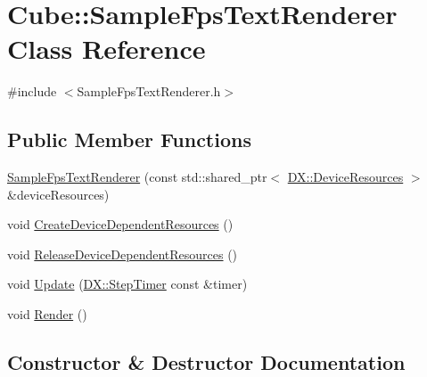 \hypertarget{class_cube_1_1_sample_fps_text_renderer}{}\section{Cube\+:\+:Sample\+Fps\+Text\+Renderer Class Reference}
\label{class_cube_1_1_sample_fps_text_renderer}


{\ttfamily \#include $<$Sample\+Fps\+Text\+Renderer.\+h$>$}

\subsection*{Public Member Functions}
\begin{DoxyCompactItemize}
\item 
\hyperlink{class_cube_1_1_sample_fps_text_renderer_ae18dc8d22694158f4380b5b607e758b6}{Sample\+Fps\+Text\+Renderer} (const std\+::shared\+\_\+ptr$<$ \hyperlink{class_d_x_1_1_device_resources}{D\+X\+::\+Device\+Resources} $>$ \&device\+Resources)
\item 
void \hyperlink{class_cube_1_1_sample_fps_text_renderer_a86bbaf2cdd8f72142c3b9461ca1b573a}{Create\+Device\+Dependent\+Resources} ()
\item 
void \hyperlink{class_cube_1_1_sample_fps_text_renderer_a2b8c34eeaf99be9555f432a1ffd9f13f}{Release\+Device\+Dependent\+Resources} ()
\item 
void \hyperlink{class_cube_1_1_sample_fps_text_renderer_a8b854131222dcece3369c6b0d34ab16a}{Update} (\hyperlink{class_d_x_1_1_step_timer}{D\+X\+::\+Step\+Timer} const \&timer)
\item 
void \hyperlink{class_cube_1_1_sample_fps_text_renderer_a2c86c474eda64ee8bed73c0590af12f3}{Render} ()
\end{DoxyCompactItemize}


\subsection{Constructor \& Destructor Documentation}
\mbox{\label{class_cube_1_1_sample_fps_text_renderer_ae18dc8d22694158f4380b5b607e758b6}} 
